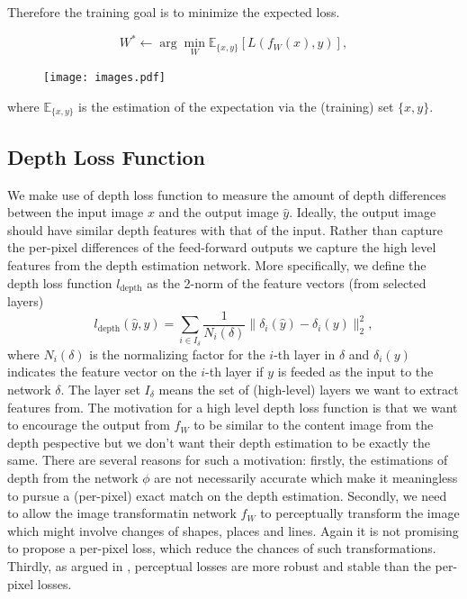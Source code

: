 \documentclass[10pt,twocolumn,letterpaper]{article}
\begin{document}
Therefore the training goal is to minimize the expected loss.

\[ W^* \gets \arg \min_W \mathbb E_{\{x,y\}}[L(f_W(x), y)], \]

\begin{figure}
\vspace*{-1in}
\hspace*{-0.7in}
\texttt{[image: images.pdf]}
\end{figure}

where $\mathbb E_{\{x,y\}}$ is the estimation of the expectation via the (training) set $\{x,y\}$.

\subsection{Depth Loss Function}

We make use of depth loss function to measure the amount of depth differences between the input image $x$ and the output image $\hat y$. Ideally, the output image should have similar depth features with that of the input. Rather than capture the per-pixel differences of the feed-forward outputs we capture the high level features from the depth estimation network. More specifically, we define the depth loss function $l_\text{depth}$ as the 2-norm of the feature vectors (from selected layers) \[l_\text{depth}(\hat y, y) = \sum_{i \in I_\delta} \frac{1}{N_i (\delta)}\|\delta_i(\hat y) - \delta_i(y)\|_2^2,\] where $N_i(\delta)$ is the normalizing factor for the $i$-th layer in $\delta$ and $\delta_i(y)$ indicates the feature vector on the $i$-th layer if $y$ is feeded as the input to the network $\delta$. The layer set $I_\delta$ means the set of (high-level) layers we want to extract features from. The motivation for a high level depth loss function is that we want to encourage the output from $f_W$ to be similar to the content image from the depth pespective but we don't want their depth estimation to be exactly the same. There are several reasons for such a motivation: firstly, the estimations of depth from the network $\phi$ are not necessarily accurate which make it meaningless to pursue a (per-pixel) exact match on the depth estimation. Secondly, we need to allow the image transformatin network $f_W$ to perceptually transform the image which might involve changes of shapes, places and lines. Again it is not promising to propose a per-pixel loss, which reduce the chances of such transformations. Thirdly, as argued in \cite{johnson2016perceptual}, perceptual losses are more robust and stable than the per-pixel losses.
\end{document}

